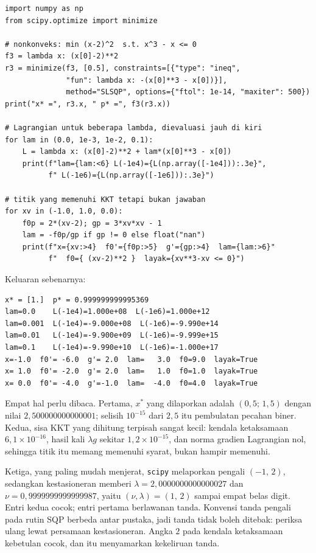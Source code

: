 \begin{lab}
\begin{verbatim}
import numpy as np
from scipy.optimize import minimize

# nonkonveks: min (x-2)^2  s.t. x^3 - x <= 0
f3 = lambda x: (x[0]-2)**2
r3 = minimize(f3, [0.5], constraints=[{"type": "ineq",
              "fun": lambda x: -(x[0]**3 - x[0])}],
              method="SLSQP", options={"ftol": 1e-14, "maxiter": 500})
print("x* =", r3.x, " p* =", f3(r3.x))

# Lagrangian untuk beberapa lambda, dievaluasi jauh di kiri
for lam in (0.0, 1e-3, 1e-2, 0.1):
    L = lambda x: (x[0]-2)**2 + lam*(x[0]**3 - x[0])
    print(f"lam={lam:<6} L(-1e4)={L(np.array([-1e4])):.3e}",
          f" L(-1e6)={L(np.array([-1e6])):.3e}")

# titik yang memenuhi KKT tetapi bukan jawaban
for xv in (-1.0, 1.0, 0.0):
    f0p = 2*(xv-2); gp = 3*xv*xv - 1
    lam = -f0p/gp if gp != 0 else float("nan")
    print(f"x={xv:>4}  f0'={f0p:>5}  g'={gp:>4}  lam={lam:>6}"
          f"  f0={ (xv-2)**2 }  layak={xv**3-xv <= 0}")
\end{verbatim}
Keluaran sebenarnya:
\begin{verbatim}
x* = [1.]  p* = 0.999999999995369
lam=0.0    L(-1e4)=1.000e+08  L(-1e6)=1.000e+12
lam=0.001  L(-1e4)=-9.000e+08  L(-1e6)=-9.990e+14
lam=0.01   L(-1e4)=-9.900e+09  L(-1e6)=-9.999e+15
lam=0.1    L(-1e4)=-9.990e+10  L(-1e6)=-1.000e+17
x=-1.0  f0'= -6.0  g'= 2.0  lam=   3.0  f0=9.0  layak=True
x= 1.0  f0'= -2.0  g'= 2.0  lam=   1.0  f0=1.0  layak=True
x= 0.0  f0'= -4.0  g'=-1.0  lam=  -4.0  f0=4.0  layak=True
\end{verbatim}
\end{lab}

Empat hal perlu dibaca. Pertama, $x^{*}$ yang dilaporkan adalah $(0{,}5;\,1{,}5)$ dengan
nilai $2{,}500000000000001$; selisih $10^{-15}$ dari $2{,}5$ itu pembulatan pecahan biner.
Kedua, sisa KKT yang dihitung terpisah sangat kecil: kendala ketaksamaan
$6{,}1\times10^{-16}$, hasil kali $\lambda g$ sekitar $1{,}2\times10^{-15}$, dan norma
gradien Lagrangian nol, sehingga titik itu memang memenuhi syarat, bukan hampir
memenuhi.

Ketiga, yang paling mudah menjerat, \texttt{scipy} melaporkan pengali $(-1,\,2)$,
sedangkan kestasioneran memberi $\lambda=2{,}0000000000000027$ dan
$\nu=0{,}9999999999999987$, yaitu $(\nu,\lambda)=(1,\,2)$ sampai empat belas digit. Entri
kedua cocok; entri pertama berlawanan tanda. Konvensi tanda pengali pada rutin SQP berbeda
antar pustaka, jadi tanda tidak boleh ditebak: periksa ulang lewat persamaan kestasioneran.
Angka $2$ pada kendala ketaksamaan kebetulan cocok, dan itu menyamarkan kekeliruan
tanda.

